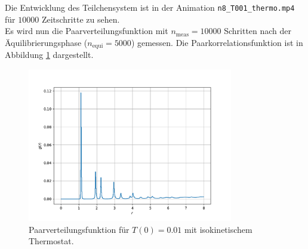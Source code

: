 Die Entwicklung des Teilchensystem ist in der Animation \texttt{n8\_T001\_thermo.mp4} für $10000$ Zeitschritte zu sehen.
\\
Es wird nun die Paarverteilungsfunktion mit $n_\text{meas}=10000$ Schritten nach der Äquilibrierungsphase ($n_\text{equi}=5000$) gemessen.
Die Paarkorrelationsfunktion ist in Abbildung \ref{fig:g_001_iso} dargestellt.
\begin{figure}
    \centering
    \includegraphics[width=0.8\textwidth]{content/plots/g_d)_T001_thermo.pdf}
    \caption{Paarverteilungsfunktion für $T(0)=0.01$ mit isokinetischem Thermostat.}
    \label{fig:g_001_iso}
\end{figure}

\FloatBarrier
